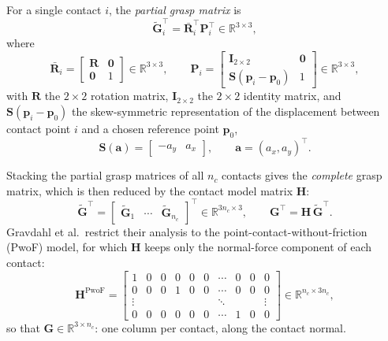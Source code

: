 For a single contact $i$, the \emph{partial grasp matrix} is
\begin{equation}
    \tilde{\boldsymbol{G}}_i^\top = \bar{\boldsymbol{R}}_i^\top \boldsymbol{P}_i^\top \in \mathbb{R}^{3 \times 3} ,
    \label{eq:partial-grasp-matrix}
\end{equation}
where
\begin{equation}
    \bar{\boldsymbol{R}}_i =
    \begin{bmatrix}
        \boldsymbol{R} & \boldsymbol{0} \\
        \boldsymbol{0} & 1
    \end{bmatrix} \in \mathbb{R}^{3\times3},
    \qquad
    \boldsymbol{P}_i =
    \begin{bmatrix}
        \boldsymbol{I}_{2\times2} & \boldsymbol{0} \\
        \boldsymbol{S}(\boldsymbol{p}_i - \boldsymbol{p}_0) & 1
    \end{bmatrix} \in \mathbb{R}^{3\times3} ,
    \label{eq:Rbar-P}
\end{equation}
with $\boldsymbol{R}$ the $2\times2$ rotation matrix, $\boldsymbol{I}_{2\times2}$ the $2\times2$
identity matrix, and $\boldsymbol{S}(\boldsymbol{p}_i - \boldsymbol{p}_0)$ the skew-symmetric
representation of the displacement between contact point $i$ and a chosen
reference point $\boldsymbol{p}_0$,
\begin{equation}
    \boldsymbol{S}(\boldsymbol{a}) = \begin{bmatrix} -a_y & a_x \end{bmatrix}, \qquad \boldsymbol{a} = (a_x, a_y)^\top .
    \label{eq:skew-2d}
\end{equation}

Stacking the partial grasp matrices of all $n_c$ contacts gives the
\emph{complete} grasp matrix, which is then reduced by the contact model
matrix $\boldsymbol{H}$:
\begin{equation}
    \tilde{\boldsymbol{G}}^\top = \begin{bmatrix} \tilde{\boldsymbol{G}}_1 & \cdots & \tilde{\boldsymbol{G}}_{n_c} \end{bmatrix}^\top \in \mathbb{R}^{3n_c \times 3} ,
    \qquad
    \boldsymbol{G}^\top = \boldsymbol{H}\,\tilde{\boldsymbol{G}}^\top .
    \label{eq:complete-grasp-matrix}
\end{equation}
Gravdahl et al.\ restrict their analysis to the point-contact-without-friction
(PwoF) model, for which $\boldsymbol{H}$ keeps only the normal-force component
of each contact:
\begin{equation}
    \boldsymbol{H}^{\mathrm{PwoF}} =
    \begin{bmatrix}
        1 & 0 & 0 & 0 & 0 & 0 & \cdots & 0 & 0 & 0 \\
        0 & 0 & 0 & 1 & 0 & 0 & \cdots & 0 & 0 & 0 \\
        \vdots & & & & & & \ddots & & & \vdots \\
        0 & 0 & 0 & 0 & 0 & 0 & \cdots & 1 & 0 & 0
    \end{bmatrix} \in \mathbb{R}^{n_c \times 3n_c} ,
    \label{eq:H-pwof-gravdahl}
\end{equation}
so that $\boldsymbol{G} \in \mathbb{R}^{3 \times n_c}$: one column per contact,
along the contact normal.

